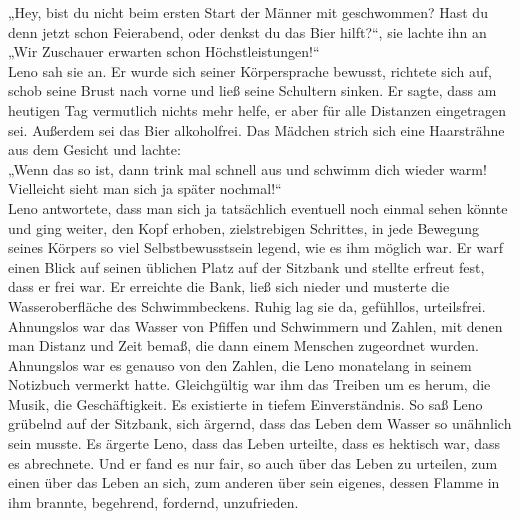 \documentclass[ngerman,smalldemyvopaper,11pt,oneside,onecolumn,openright,extrafontsizes]{memoir}
\begin{document}
„Hey, bist du nicht beim ersten Start der Männer mit geschwommen? Hast du denn jetzt schon Feierabend, oder denkst du das Bier hilft?“, sie lachte ihn an „Wir Zuschauer erwarten schon Höchstleistungen!“\\
Leno sah sie an. Er wurde sich seiner Körpersprache bewusst, richtete sich auf, schob seine Brust nach vorne und ließ seine Schultern sinken. Er sagte, dass am heutigen Tag vermutlich nichts mehr helfe, er aber für alle Distanzen eingetragen sei. Außerdem sei das Bier alkoholfrei. Das Mädchen strich sich eine Haarsträhne aus dem Gesicht und lachte:\\
„Wenn das so ist, dann trink mal schnell aus und schwimm dich wieder warm! Vielleicht sieht man sich ja später nochmal!“\\
Leno antwortete, dass man sich ja tatsächlich eventuell noch einmal sehen könnte und ging weiter, den Kopf erhoben, zielstrebigen Schrittes, in jede Bewegung seines Körpers so viel Selbstbewusstsein legend, wie es ihm möglich war. Er warf einen Blick auf seinen üblichen Platz auf der Sitzbank und stellte erfreut fest, dass er frei war. Er erreichte die Bank, ließ sich nieder und musterte die Wasseroberfläche des Schwimmbeckens. Ruhig lag sie da, gefühllos, urteilsfrei. Ahnungslos war das Wasser von Pfiffen und Schwimmern und Zahlen, mit denen man Distanz und Zeit bemaß, die dann einem Menschen zugeordnet wurden. Ahnungslos war es genauso von den Zahlen, die Leno monatelang in seinem Notizbuch vermerkt hatte. Gleichgültig war ihm das Treiben um es herum, die Musik, die Geschäftigkeit. Es existierte in tiefem Einverständnis. So saß Leno grübelnd auf der Sitzbank, sich ärgernd, dass das Leben dem Wasser so unähnlich sein musste. Es ärgerte Leno, dass das Leben urteilte, dass es hektisch war, dass es abrechnete. Und er fand es nur fair, so auch über das Leben zu urteilen, zum einen über das Leben an sich, zum anderen über sein eigenes, dessen Flamme in ihm brannte, begehrend, fordernd, unzufrieden.\\
\end{document}
